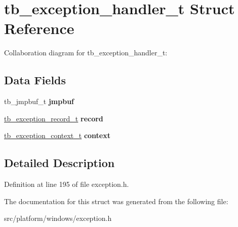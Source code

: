 \hypertarget{structtb__exception__handler__t}{\section{tb\-\_\-exception\-\_\-handler\-\_\-t Struct Reference}
\label{structtb__exception__handler__t}
}


Collaboration diagram for tb\-\_\-exception\-\_\-handler\-\_\-t\-:
\subsection*{Data Fields}
\begin{DoxyCompactItemize}
\item 
\hypertarget{structtb__exception__handler__t_abe087dbcf2d66f257d638d0521cc042e}{tb\-\_\-jmpbuf\-\_\-t {\bfseries jmpbuf}}\label{structtb__exception__handler__t_abe087dbcf2d66f257d638d0521cc042e}

\item 
\hypertarget{structtb__exception__handler__t_a25ddac541a35465be40b6cc362aa32c4}{\hyperlink{structtb__exception__record__t}{tb\-\_\-exception\-\_\-record\-\_\-t} {\bfseries record}}\label{structtb__exception__handler__t_a25ddac541a35465be40b6cc362aa32c4}

\item 
\hypertarget{structtb__exception__handler__t_a857d45afecda819f80f47e46e90a7c87}{\hyperlink{structtb__exception__context__t}{tb\-\_\-exception\-\_\-context\-\_\-t} {\bfseries context}}\label{structtb__exception__handler__t_a857d45afecda819f80f47e46e90a7c87}

\end{DoxyCompactItemize}


\subsection{Detailed Description}


Definition at line 195 of file exception.\-h.



The documentation for this struct was generated from the following file\-:\begin{DoxyCompactItemize}
\item 
src/platform/windows/exception.\-h\end{DoxyCompactItemize}
